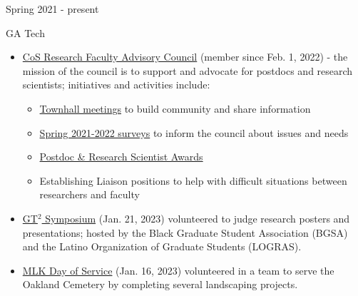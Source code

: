 \documentclass[a4paper,10pt]{article}
\newlength{\cvcolumngapwidth}
\newlength{\cvleftcolumnwidth}
\newlength{\cvrightcolumnwidth}
\newcommand{\cvtitlestyle}[1]{{\large\cvtitlefont\textcolor{cvtitlecolor}{#1}}}
\newcommand{\cvheadingstyle}[1]{{\normalsize\cvheadingfont\textcolor{cvheadingcolor}{#1}}}
\newlength{\cvafteritemskipamount}
\newlength{\cvaftertitleskipamount}
\newlength{\cvparskip}
\newcommand{\cvitem}[2]{
            \begin{minipage}[t]{\cvleftcolumnwidth}
                \raggedleft #1
            \end{minipage}%
            \hspace{\cvcolumngapwidth}%
            \begin{minipage}[t]{\cvrightcolumnwidth}
                \setlength{\parskip}{\cvparskip} #2
            \end{minipage}
        
            \vspace{\cvafteritemskipamount}
        }
\newcommand{\cvtitle}[1]{
            \cvtitlestyle{#1}
        
            \vspace{\cvaftertitleskipamount}
            \vspace{-\cvparskip}
        }
\begin{document}
\cvitem{
    \cvheadingstyle{Spring 2021 - present}
}{
    \cvtitle{GA Tech }
            \begin{itemize}[leftmargin=*]
            \item \href{https://rfac.cos.gatech.edu/}{CoS Research Faculty Advisory Council} (member since Feb. 1, 2022) - the mission of the council is to support and advocate for postdocs and research scientists; initiatives and activities include:
            \begin{itemize}[leftmargin=*]
             \item \href{https://rfac.cos.gatech.edu/rf-community-and-support/town-halls/}{Townhall meetings} to build community and share information            
             \item \href{https://rfac.cos.gatech.edu/rf-community-and-support/climate-surveys/}{Spring 2021-2022 surveys} to inform the council about issues and needs
             \item \href{https://rfac.cos.gatech.edu/rf-community-and-support/research-faculty-awards/}{Postdoc \& Research Scientist Awards}
             \item Establishing Liaison positions to help with difficult situations between researchers and faculty 
	        \end{itemize}
	    \end{itemize}
	    
	   \begin{itemize}[leftmargin=*]
            \item \href{https://www.gatech.edu/event/2023/01/03/2023-georgia-tech-graduate-technical-gt2-symposium-world-opportunities-pathways}{GT$^2$ Symposium} (Jan. 21, 2023) volunteered to judge research posters and presentations; hosted by the Black Graduate Student Association (BGSA) and the Latino Organization of Graduate Students (LOGRAS).
            \item \href{https://www.gatech.edu/event/2022/11/29/mlk-day-service}{MLK Day of Service} (Jan. 16, 2023) volunteered in a team to serve the Oakland Cemetery by completing several landscaping projects.
            \end{itemize}
	}
            
\end{document}
